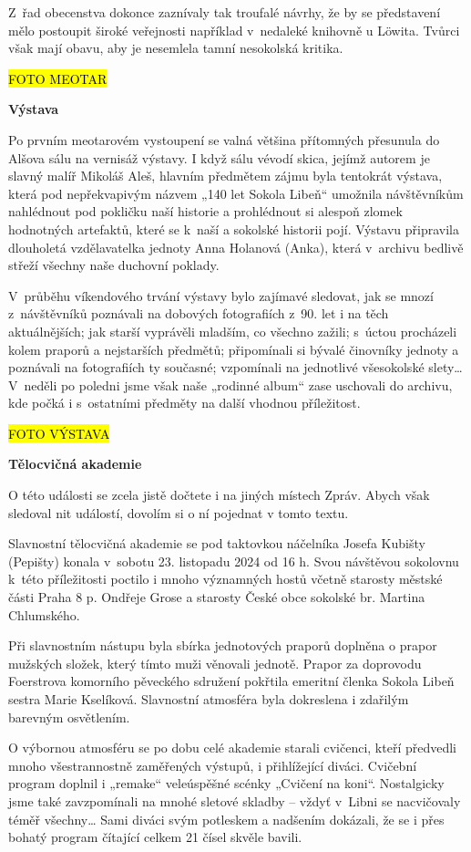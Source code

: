 Z~řad obecenstva dokonce zaznívaly tak troufalé návrhy, že by se
představení mělo postoupit široké veřejnosti například v~nedaleké
knihovně u Löwita. Tvůrci však mají obavu, aby je nesemlela tamní
nesokolská kritika.

\hl{FOTO MEOTAR}

\textbf{Výstava}

Po prvním meotarovém vystoupení se valná většina přítomných přesunula do
Alšova sálu na vernisáž výstavy. I když sálu vévodí skica, jejímž
autorem je slavný malíř Mikoláš Aleš, hlavním předmětem zájmu byla
tentokrát výstava, která pod nepřekvapivým názvem „140 let Sokola
Libeň`` umožnila návštěvníkům nahlédnout pod pokličku naší historie a
prohlédnout si alespoň zlomek hodnotných artefaktů, které se k~naší a
sokolské historii pojí. Výstavu připravila dlouholetá vzdělavatelka
jednoty Anna Holanová (Anka), která v~archivu bedlivě střeží všechny
naše duchovní poklady.

V~průběhu víkendového trvání výstavy bylo zajímavé sledovat, jak se
mnozí z~návštěvníků poznávali na dobových fotografiích z~90. let i na
těch aktuálnějších; jak starší vyprávěli mladším, co všechno zažili;
s~úctou procházeli kolem praporů a nejstarších předmětů; připomínali si
bývalé činovníky jednoty a poznávali na fotografiích ty současné;
vzpomínali na jednotlivé všesokolské slety\ldots{} V~neděli po poledni
jsme však naše „rodinné album`` zase uschovali do archivu, kde počká i
s~ostatními předměty na další vhodnou příležitost.

\hl{FOTO VÝSTAVA}

\textbf{Tělocvičná akademie}

O této události se zcela jistě dočtete i na jiných místech Zpráv. Abych
však sledoval nit událostí, dovolím si o ní pojednat v tomto textu.

Slavnostní tělocvičná akademie se pod taktovkou náčelníka Josefa Kubišty
(Pepišty) konala v~sobotu 23. listopadu 2024 od 16 h. Svou návštěvou
sokolovnu k~této příležitosti poctilo i mnoho významných hostů včetně
starosty městské části Praha 8 p. Ondřeje Grose a starosty České obce
sokolské br. Martina Chlumského.

Při slavnostním nástupu byla sbírka jednotových praporů doplněna o
prapor mužských složek, který tímto muži věnovali jednotě. Prapor za
doprovodu Foerstrova komorního pěveckého sdružení pokřtila emeritní
členka Sokola Libeň sestra Marie Kselíková. Slavnostní atmosféra byla
dokreslena i zdařilým barevným osvětlením.

O výbornou atmosféru se po dobu celé akademie starali cvičenci, kteří
předvedli mnoho všestrannostně zaměřených výstupů, i přihlížející
diváci. Cvičební program doplnil i „remake`` veleúspěšné scénky „Cvičení
na koni``. Nostalgicky jsme také zavzpomínali na mnohé sletové skladby
-- vždyť v~Libni se nacvičovaly téměř všechny\ldots{} Sami diváci svým
potleskem a nadšením dokázali, že se i přes bohatý program čítající
celkem 21 čísel skvěle bavili.

